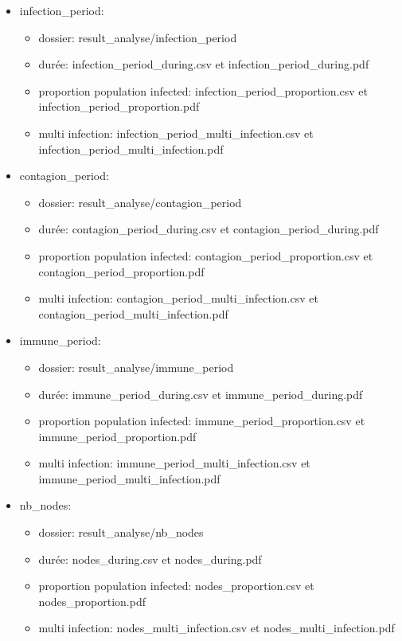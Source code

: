 \documentclass[a4paper, 11pt]{article}
\begin{document}
\begin{itemize}
				\item infection\_period:
				\begin{itemize}
					\item dossier: result\_analyse/infection\_period
					\item durée: infection\_period\_during.csv et infection\_period\_during.pdf
					\item proportion population infected: infection\_period\_proportion.csv et infection\_period\_proportion.pdf
					\item multi infection: infection\_period\_multi\_infection.csv et infection\_period\_multi\_infection.pdf
				\end{itemize}
				
				\item contagion\_period:
				\begin{itemize}
					\item dossier: result\_analyse/contagion\_period
					\item durée: contagion\_period\_during.csv et contagion\_period\_during.pdf
					\item proportion population infected: contagion\_period\_proportion.csv et contagion\_period\_proportion.pdf
					\item multi infection: contagion\_period\_multi\_infection.csv et contagion\_period\_multi\_infection.pdf
				\end{itemize}
				
				\item immune\_period:
				\begin{itemize}
					\item dossier: result\_analyse/immune\_period
					\item durée: immune\_period\_during.csv et immune\_period\_during.pdf
					\item proportion population infected: immune\_period\_proportion.csv et immune\_period\_proportion.pdf
					\item multi infection: immune\_period\_multi\_infection.csv et immune\_period\_multi\_infection.pdf
				\end{itemize}
				
				\item nb\_nodes:
				\begin{itemize}
					\item dossier: result\_analyse/nb\_nodes
					\item durée: nodes\_during.csv et nodes\_during.pdf
					\item proportion population infected: nodes\_proportion.csv et nodes\_proportion.pdf
					\item multi infection: nodes\_multi\_infection.csv et nodes\_multi\_infection.pdf
				\end{itemize}
			\end{itemize}
	
\end{document}
